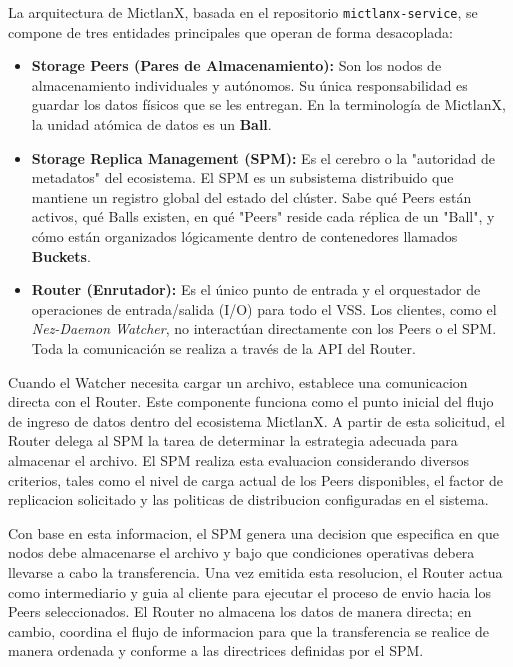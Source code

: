 La arquitectura de MictlanX, basada en el repositorio \texttt{mictlanx-service}, se compone de tres entidades principales que operan de forma desacoplada:
\begin{itemize}
    \item \textbf{Storage Peers (Pares de Almacenamiento):} Son los nodos de almacenamiento individuales y autónomos. Su única responsabilidad es guardar los datos físicos que se les entregan. En la terminología de MictlanX, la unidad atómica de datos es un \textbf{Ball}.
    
    \item \textbf{Storage Replica Management (SPM):} Es el cerebro o la "autoridad de metadatos" del ecosistema. El SPM es un subsistema distribuido que mantiene un registro global del estado del clúster. Sabe qué Peers están activos, qué Balls existen, en qué "Peers" reside cada réplica de un "Ball", y cómo están organizados lógicamente dentro de contenedores llamados \textbf{Buckets}.
    
    \item \textbf{Router (Enrutador):} Es el único punto de entrada y el orquestador de operaciones de entrada/salida (I/O) para todo el VSS. Los clientes, como el \textit{Nez-Daemon Watcher}, no interactúan directamente con los Peers o el SPM. Toda la comunicación se realiza a través de la API del Router.
\end{itemize}

Cuando el Watcher necesita cargar un archivo, establece una comunicacion directa con el Router. Este componente funciona como el punto inicial del flujo de ingreso de datos dentro del ecosistema MictlanX. A partir de esta solicitud, el Router delega al SPM la tarea de determinar la estrategia adecuada para almacenar el archivo. El SPM realiza esta evaluacion considerando diversos criterios, tales como el nivel de carga actual de los Peers disponibles, el factor de replicacion solicitado y las politicas de distribucion configuradas en el sistema.

Con base en esta informacion, el SPM genera una decision que especifica en que nodos debe almacenarse el archivo y bajo que condiciones operativas debera llevarse a cabo la transferencia. Una vez emitida esta resolucion, el Router actua como intermediario y guia al cliente para ejecutar el proceso de envio hacia los Peers seleccionados. El Router no almacena los datos de manera directa; en cambio, coordina el flujo de informacion para que la transferencia se realice de manera ordenada y conforme a las directrices definidas por el SPM.


